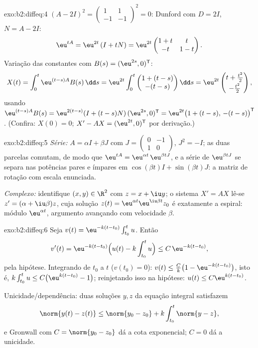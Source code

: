 \begin{solution}{exo:b2:diffeq:4}
$(A - 2I)^2 = \begin{pmatrix}1 & 1\\ -1 & -1\end{pmatrix}^2 = 0$:
Dunford com $D = 2I$, $N = A - 2I$:
\[
\eu^{tA} = \eu^{2t}\,(I + tN)
= \eu^{2t}\begin{pmatrix} 1 + t & t\\ -t & 1 - t\end{pmatrix}.
\]
Variação das constantes com $B(s) = (\eu^{2s}, 0)^{\mathsf T}$:
\[
X(t) = \int_0^t \eu^{(t-s)A}B(s)\,\dd s
= \eu^{2t}\int_0^t \begin{pmatrix} 1 + (t-s)\\ -(t-s)
\end{pmatrix}\dd s
= \eu^{2t}\begin{pmatrix} t + \frac{t^2}{2}\\[2pt] -\frac{t^2}{2}
\end{pmatrix},
\]
usando $\eu^{(t-s)A}B(s) = \eu^{2(t-s)}(I + (t-s)N)\,(\eu^{2s},
0)^{\mathsf T} = \eu^{2t}\bigl(1 + (t-s),\, -(t-s)\bigr)^{\mathsf
T}$. (Confira: $X(0) = 0$; $X' - AX = (\eu^{2t}, 0)^{\mathsf T}$
por derivação.)
\end{solution}

\begin{solution}{exo:b2:diffeq:5}
\emph{Série:} $A = \alpha I + \beta J$ com $J =
\begin{pmatrix}0 & -1\\ 1 & 0\end{pmatrix}$, $J^2 = -I$; as duas
parcelas comutam, de modo que $\eu^{tA} = \eu^{\alpha t}\,\eu^{\beta tJ}$,
e a série de $\eu^{\beta t J}$ se separa nas potências pares e ímpares
em $\cos(\beta t)I + \sin(\beta t)J$: a matriz de rotação com escala
enunciada.

\emph{Complexo:} identifique $(x, y) \in \R^2$ com $z = x + \iu y$;
o sistema $X' = AX$ lê-se $z' = (\alpha + \iu\beta)z$, cuja
solução $z(t) = \eu^{\alpha t}\eu^{\iu\beta t}z_0$ é exatamente a
espiral: módulo $\eu^{\alpha t}$, argumento avançando com velocidade
$\beta$.
\end{solution}

\begin{solution}{exo:b2:diffeq:6}
Seja $v(t) = \eu^{-k(t - t_0)}\int_{t_0}^t u$. Então
\[
v'(t) = \eu^{-k(t-t_0)}\Bigl(u(t) - k\int_{t_0}^t u\Bigr)
\leq C\,\eu^{-k(t-t_0)},
\]
pela hipótese. Integrando de $t_0$ a $t$ ($v(t_0) = 0$):
$v(t) \leq \frac{C}{k}\bigl(1 - \eu^{-k(t - t_0)}\bigr)$, isto é,
$k\int_{t_0}^t u \leq C\bigl(\eu^{k(t-t_0)} - 1\bigr)$; reinjetando
isso na hipótese: $u(t) \leq C\eu^{k(t-t_0)}$.

Unicidade/dependência: duas soluções $y, z$ da equação integral
satisfazem
\[
\norm{y(t) - z(t)} \leq \norm{y_0 - z_0} +
k\int_{t_0}^{t}\norm{y - z},
\]
e Gronwall com $C = \norm{y_0 - z_0}$ dá a cota
exponencial; $C = 0$ dá a unicidade.
\end{solution}

